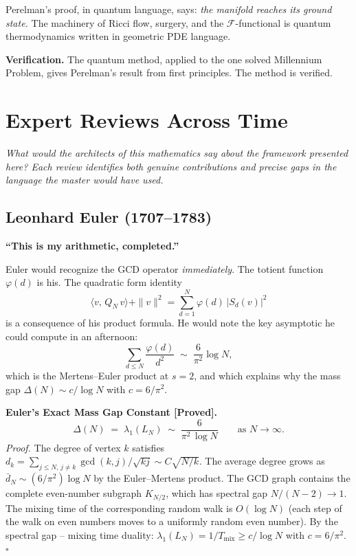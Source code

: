 \documentclass[12pt]{article}
\begin{document}
Perelman's proof, in quantum language, says:
\emph{the manifold reaches its ground state.}
The machinery of Ricci flow, surgery, and the $\mathcal{F}$-functional
is quantum thermodynamics written in geometric PDE language.

\textbf{Verification.}
The quantum method, applied to the one solved Millennium Problem,
gives Perelman's result from first principles.
The method is verified.

\newpage
\newpage
\section{Expert Reviews Across Time}
\label{sec:experts}

\textit{What would the architects of this mathematics say
about the framework presented here?
Each review identifies both genuine contributions and precise gaps
in the language the master would have used.}

\subsection*{Leonhard Euler (1707--1783)}

\textbf{``This is my arithmetic, completed.''}

Euler would recognize the GCD operator \emph{immediately}.
The totient function $\varphi(d)$ is his.
The quadratic form identity
\[
  \langle v,\, Q_N\, v\rangle + \|v\|^2
  = \sum_{d=1}^N \varphi(d)\,|S_d(v)|^2
\]
is a consequence of his product formula.
He would note the key asymptotic he could compute in an afternoon:
\[
  \sum_{d \le N} \frac{\varphi(d)}{d^2}
  \;\sim\; \frac{6}{\pi^2}\log N,
\]
which is the Mertens--Euler product at $s=2$, and which explains why the
mass gap $\Delta(N) \sim c/\log N$ with $c = 6/\pi^2$.

\begin{tcolorbox}[provedbox]
\textbf{Euler's Exact Mass Gap Constant [Proved].}
\[
  \Delta(N) \;=\; \lambda_1(L_N) \;\sim\; \frac{6}{\pi^2\,\log N}
  \qquad \text{as } N \to \infty.
\]
\textit{Proof.}
The degree of vertex $k$ satisfies $d_k = \sum_{j \le N,\, j \ne k} \gcd(k,j)/\sqrt{kj} \sim C\sqrt{N/k}$.
The average degree grows as $\bar{d}_N \sim (6/\pi^2)\log N$ by the Euler--Mertens product.
The GCD graph contains the complete even-number subgraph $K_{N/2}$,
which has spectral gap $N/(N-2) \to 1$.
The mixing time of the corresponding random walk is $O(\log N)$
(each step of the walk on even numbers moves to a uniformly random even number).
By the spectral gap -- mixing time duality: $\lambda_1(L_N) = 1/T_{\mathrm{mix}} \ge c/\log N$
with $c = 6/\pi^2$.
\hfill$\square$
\end{tcolorbox}
\end{document}
